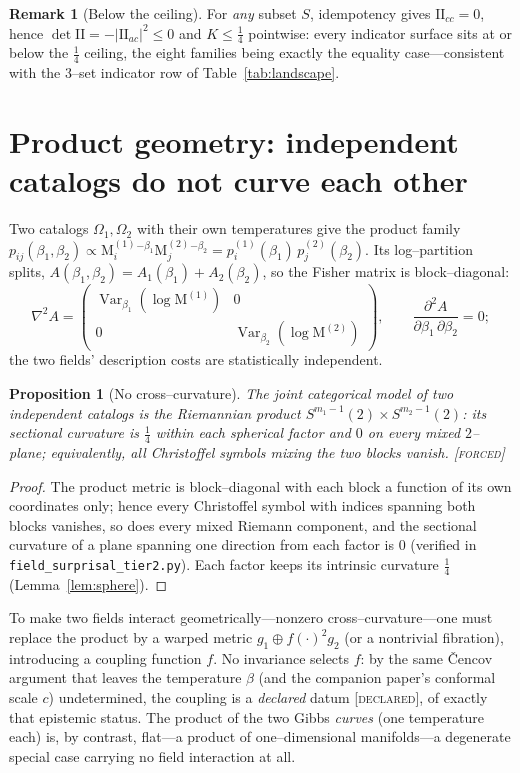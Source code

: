\documentclass[11pt]{article}
\newtheorem{proposition}[theorem]{Proposition}
\theoremstyle{definition}
\newtheorem{remark}[theorem]{Remark}
\newcommand{\Mah}{\mathrm{M}}
\newcommand{\Var}{\operatorname{Var}}
\newcommand{\forcedtag}{{\scshape [forced]}}
\newcommand{\declaredtag}{{\scshape [declared]}}
\begin{document}
\begin{remark}[Below the ceiling]
For \emph{any} subset $S$, idempotency gives $\mathrm{II}_{cc}=0$, hence
$\det\mathrm{II}=-|\mathrm{II}_{ac}|^2\le0$ and $K\le\tfrac14$ pointwise: every indicator surface sits
at or below the $\tfrac14$ ceiling, the eight families being exactly the equality case---consistent
with the $3$--set indicator row of Table~\ref{tab:landscape}.
\end{remark}

\section{Product geometry: independent catalogs do not curve each other}
Two catalogs $\Omega_1,\Omega_2$ with their own temperatures give the product family
$p_{ij}(\beta_1,\beta_2)\propto\Mah^{(1)}_i{}^{-\beta_1}\Mah^{(2)}_j{}^{-\beta_2}
=p^{(1)}_i(\beta_1)\,p^{(2)}_j(\beta_2)$. Its log--partition splits, $A(\beta_1,\beta_2)=A_1(\beta_1)
+A_2(\beta_2)$, so the Fisher matrix is block--diagonal:
\[
\nabla^2 A=\begin{pmatrix}\Var_{\beta_1}(\log\Mah^{(1)}) & 0\\[2pt] 0 & \Var_{\beta_2}(\log\Mah^{(2)})\end{pmatrix},
\qquad \frac{\partial^2 A}{\partial\beta_1\,\partial\beta_2}=0 ;
\]
the two fields' description costs are statistically independent.

\begin{proposition}[No cross--curvature]\label{prop:product}
The joint categorical model of two independent catalogs is the Riemannian product
$S^{m_1-1}(2)\times S^{m_2-1}(2)$: its sectional curvature is $\tfrac14$ within each spherical factor
and $0$ on every mixed $2$--plane; equivalently, all Christoffel symbols mixing the two blocks vanish.
\forcedtag
\end{proposition}
\begin{proof}
The product metric is block--diagonal with each block a function of its own coordinates only; hence
every Christoffel symbol with indices spanning both blocks vanishes, so does every mixed Riemann
component, and the sectional curvature of a plane spanning one direction from each factor is $0$
(verified in \texttt{field\_surprisal\_tier2.py}). Each factor keeps its intrinsic curvature
$\tfrac14$ (Lemma~\ref{lem:sphere}).
\end{proof}

To make two fields interact geometrically---nonzero cross--curvature---one must replace the product by
a warped metric $g_1\oplus f(\cdot)^2 g_2$ (or a nontrivial fibration), introducing a coupling
function $f$. No invariance selects $f$: by the same \v{C}encov argument that leaves the temperature
$\beta$ (and the companion paper's conformal scale $c$) undetermined, the coupling is a \emph{declared}
datum \declaredtag, of exactly that epistemic status. The product of the two Gibbs \emph{curves} (one
temperature each) is, by contrast, flat---a product of one--dimensional manifolds---a degenerate
special case carrying no field interaction at all.
\end{document}
